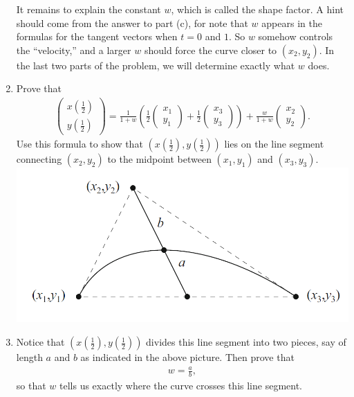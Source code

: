 \begin{exercise}{16}
\begin{enumerate}
        It remains to explain the constant $w$, which is called the shape factor. 
        A hint should come from the answer to part (c), for note that $w$ appears in the formulas for the tangent vectors when $t=0$ and $1$. 
        So $w$ somehow controls the ``velocity,'' and a larger $w$ should force the curve closer to $(x_2,y_2)$. 
        In the last two parts of the problem, we will determine exactly what $w$ does.
        \item Prove that
        \begin{align*}
            \left(\begin{array}{c}
                x
                \left(\frac{1}{2}\right)\\ 
                y\left(\frac{1}{2}\right)
            \end{array}\right) 
            = \frac{1}{1+w}\left(\frac{1}{2}
                \left(\begin{array}{c}
                    x_1\\ 
                    y_1\end{array}\right) 
                + \frac{1}{2}
                \left(\begin{array}{c}
                    x_3\\ 
                    y_3\end{array}\right) \right) 
                + \frac{w}{1+w}
                \left(\begin{array}{c}
                    x_2\\ 
                    y_2\end{array}\right).
        \end{align*}
        Use this formula to show that $\left(x\left(\frac{1}{2}\right),y\left(\frac{1}{2}\right)\right)$ lies on the line segment connecting $(x_2,y_2)$ to the midpoint between $(x_1,y_1)$ and $(x_3,y_3)$.
        \includegraphics[width=0.8\linewidth]{cox-little-oshea/ch1/assets/sec1-3-ex16a.png}
        \item Notice that $\left(x\left(\frac{1}{2}\right), y\left(\frac{1}{2}\right)\right)$ divides this line segment into two pieces, say of length $a$ and $b$ as indicated in the above picture. Then prove that
        \begin{align*}
            w = \frac{a}{b},
        \end{align*}
        so that $w$ tells us exactly where the curve crosses this line segment.
    \end{enumerate}
\end{exercise}
